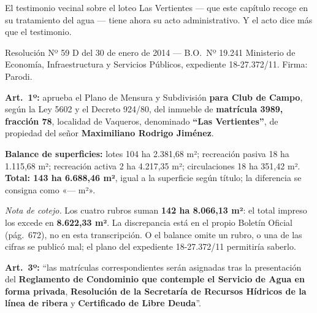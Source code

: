 El testimonio vecinal sobre el loteo Las Vertientes --- que este capítulo recoge en su tratamiento del agua --- tiene ahora su acto administrativo. Y el acto dice más que el testimonio.

\begin{ficha}{Resolución Nº 59 D del 30 de enero de 2014 --- B.O.\ Nº 19.241}
Ministerio de Economía, Infraestructura y Servicios Públicos, expediente 18-27.372/11. Firma: Parodi.

\textbf{Art.\ 1º:} aprueba el Plano de Mensura y Subdivisión \textbf{para Club de Campo}, según la Ley 5602 y el Decreto 924/80, del inmueble de \textbf{matrícula 3989, fracción 78}, localidad de Vaqueros, denominado \textbf{``Las Vertientes''}, de propiedad del señor \textbf{Maximiliano Rodrigo Jiménez}.

\textbf{Balance de superficies:} lotes 104 ha 2.381,68 m²; recreación pasiva 18 ha 1.115,68 m²; recreación activa 2 ha 4.217,35 m²; circulaciones 18 ha 351,42 m². \textbf{Total: 143 ha 6.688,46 m²}, igual a la superficie según título; la diferencia se consigna como «--- m²».

\textit{Nota de cotejo.} Los cuatro rubros suman \textbf{142 ha 8.066,13 m²}: el total impreso los excede en \textbf{8.622,33 m²}. La discrepancia está en el propio Boletín Oficial (pág.\ 672), no en esta transcripción. O el balance omite un rubro, o una de las cifras se publicó mal; el plano del expediente 18-27.372/11 permitiría saberlo.

\textbf{Art.\ 3º:} ``las matrículas correspondientes serán asignadas tras la presentación del \textbf{Reglamento de Condominio que contemple el Servicio de Agua en forma privada}, \textbf{Resolución de la Secretaría de Recursos Hídricos de la línea de ribera} y \textbf{Certificado de Libre Deuda}''.
\end{ficha}

